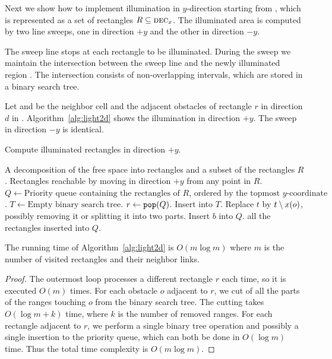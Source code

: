\documentclass[english,gradu]{tktltiki2018}
\begin{document}
Next we show how to implement illumination in $y$-direction starting from , which is represented as a set of rectangles $R\subseteq\textsc{dec}_{x}$.
The illuminated area is computed by two line sweeps, one in direction $+y$ and the other in direction $-y$.

The sweep line stops at each rectangle to be illuminated.
During the sweep we maintain the intersection between the sweep line and the newly illuminated region .
The intersection consists of non-overlapping intervals, which are stored in a binary search tree.

Let  and  be the neighbor cell and the adjacent obstacles of rectangle $r$ in direction $d$ in .
Algorithm~\ref{alg:light2d} shows the illumination in direction $+y$.
The sweep in direction $-y$ is identical.

\begin{algorithm}
\caption{Compute illuminated rectangles in direction $+y$.}\label{alg:light2d}
\begin{algorithmic}
\Require A decomposition of the free space into rectangles and a subset of the rectangles $R$.
\Output Rectangles reachable by moving in direction $+y$ from any point in $R$.
\State $Q\gets\text{Priority queue containing the rectangles of $R$, ordered by the topmost $y$-coordinate}$.
\State $T\gets\text{Empty binary search tree}$.
	\State $r\gets\texttt{pop}(Q)$.
		\State Insert  into $T$.
	\EndIf
			\State Replace $t$ by $t\setminus x(o)$, possibly removing it or splitting it into two parts.
		\EndFor
	\EndFor
			\State Insert $b$ into $Q$.
		\EndIf
	\EndFor
\EndWhile
\State \Return all the rectangles inserted into $Q$.
\end{algorithmic}
\end{algorithm}

\begin{lem}\label{lem:light2dtime}The running time of Algorithm~\ref{alg:light2d} is $O(m\log m)$ where $m$ is the number of visited rectangles and their neighbor links.\end{lem}
\begin{proof}
The outermost loop processes a different rectangle $r$ each time, so it is executed $O(m)$ times.
For each obstacle $o$ adjacent to $r$, we cut of all the parts of the ranges touching $o$ from the binary search tree.
The cutting takes $O(\log m + k)$ time, where $k$ is the number of removed ranges.
For each rectangle adjacent to $r$, we perform a single binary tree operation and possibly a single insertion to the priority queue, which can both be done in $O(\log m)$ time.
Thus the total time complexity is $O(m\log m)$.
\end{proof}
\end{document}
